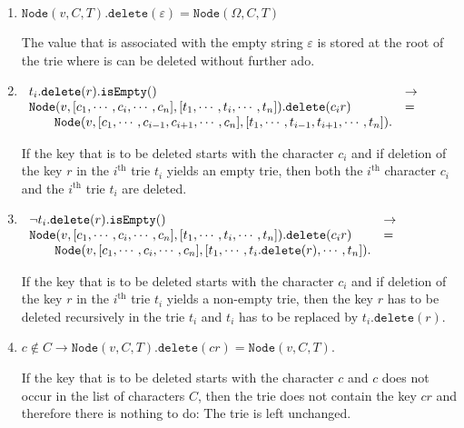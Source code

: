 \begin{enumerate}
\item $\texttt{Node}(v,C,T).\texttt{delete}(\varepsilon) = \texttt{Node}(\Omega,C,T)$

      The value that is associated with the empty  string $\varepsilon$ is stored at the root of the
      trie where is can be deleted without further ado.
\item $\begin{array}[t]{ll}
       t_i.\texttt{delete}(r).\texttt{isEmpty}()   & \rightarrow \\
       \texttt{Node}(v, [c_1,\cdots,c_i,\cdots,c_n],[t_1,\cdots,t_i,\cdots,t_n]).\texttt{delete}(c_ir) 
       & = \\
       \qquad 
       \texttt{Node}(v, [c_1,\cdots,c_{i-1},c_{i+1},\cdots,c_n],[t_1,\cdots,t_{i-1},t_{i+1},\cdots,t_n]).
       \end{array}
       $

       If  the key that is to be deleted starts with the character $c_i$ and if deletion of  the key
       $r$ in the $i^\textrm{th}$  trie $t_i$ yields an empty
       trie, then both the $i^\textrm{th}$ character $c_i$ and the $i^\textrm{th}$ trie $t_i$ are deleted.
\item $\begin{array}[t]{ll}
       \neg t_i.\texttt{delete}(r).\texttt{isEmpty}()   & \rightarrow \\
       \texttt{Node}(v, [c_1,\cdots,c_i,\cdots,c_n],[t_1,\cdots,t_i,\cdots,t_n]).\texttt{delete}(c_ir) 
       & = \\
       \qquad \texttt{Node}(v, [c_1,\cdots,c_i,\cdots,c_n],[t_1,\cdots,t_i.\texttt{delete}(r),\cdots,t_n]).
       \end{array}
       $

       If  the key that is to be deleted starts with the character $c_i$ and if deletion of  the key
       $r$ in the $i^\textrm{th}$  trie $t_i$ yields a non-empty trie, then the key $r$ has to be deleted recursively
       in the trie $t_i$ and $t_i$ has to be replaced by $t_i.\texttt{delete}(r)$.
\item $c \notin C \rightarrow \texttt{Node}(v, C, T).\texttt{delete}(cr) =
       \texttt{Node}(v, C, T)$. 
       
       If  the key that is to be deleted starts with the character $c$ and $c$ does not occur in
       the list of characters $C$, then the trie does not contain the key $cr$ and therefore there
       is nothing to do:  The trie is left unchanged.
\end{enumerate}

